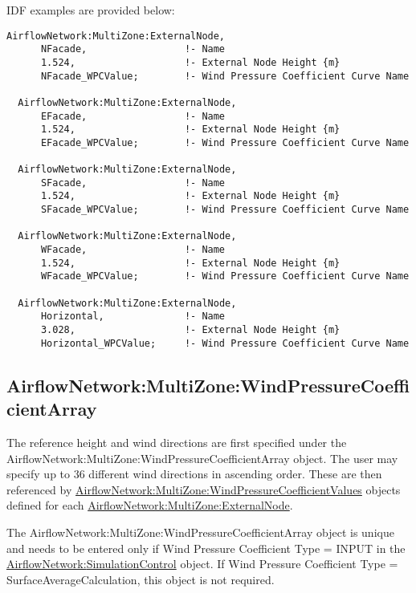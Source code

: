 IDF examples are provided below:

\begin{lstlisting}
AirflowNetwork:MultiZone:ExternalNode,
      NFacade,                 !- Name
      1.524,                   !- External Node Height {m}
      NFacade_WPCValue;        !- Wind Pressure Coefficient Curve Name

  AirflowNetwork:MultiZone:ExternalNode,
      EFacade,                 !- Name
      1.524,                   !- External Node Height {m}
      EFacade_WPCValue;        !- Wind Pressure Coefficient Curve Name

  AirflowNetwork:MultiZone:ExternalNode,
      SFacade,                 !- Name
      1.524,                   !- External Node Height {m}
      SFacade_WPCValue;        !- Wind Pressure Coefficient Curve Name

  AirflowNetwork:MultiZone:ExternalNode,
      WFacade,                 !- Name
      1.524,                   !- External Node Height {m}
      WFacade_WPCValue;        !- Wind Pressure Coefficient Curve Name

  AirflowNetwork:MultiZone:ExternalNode,
      Horizontal,              !- Name
      3.028,                   !- External Node Height {m}
      Horizontal_WPCValue;     !- Wind Pressure Coefficient Curve Name
\end{lstlisting}

\subsection{AirflowNetwork:MultiZone:WindPressureCoefficientArray}\label{airflownetworkmultizonewindpressurecoefficientarray}

The reference height and wind directions are first specified under the AirflowNetwork:MultiZone:WindPressureCoefficientArray object. The user may specify up to 36 different wind directions in ascending order. These are then referenced by \hyperref[airflownetworkmultizonewindpressurecoefficientvalues]{AirflowNetwork:MultiZone:WindPressureCoefficientValues} objects defined for each \hyperref[airflownetworkmultizoneexternalnode]{AirflowNetwork:MultiZone:ExternalNode}.

The AirflowNetwork:MultiZone:WindPressureCoefficientArray object is unique and needs to be entered only if Wind Pressure Coefficient Type = INPUT in the \hyperref[airflownetworksimulationcontrol]{AirflowNetwork:\hyperref[simulationcontrol]{SimulationControl}} object. If Wind Pressure Coefficient Type = SurfaceAverageCalculation, this object is not required.

